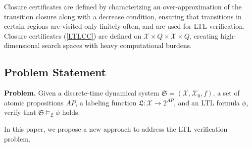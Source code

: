 Closure certificates are defined by characterizing an over-approximation of the transition closure along with a decrease condition, ensuring that transitions in certain regions are visited only finitely often, and are used for LTL verification. Closure certificates (\ref{LTLCC}) are defined on $\mathcal{X} \times Q \times \mathcal{X} \times Q$, creating high-dimensional search spaces with heavy computational burdens. 




\subsection{Problem Statement}
\textbf{Problem.} Given a discrete-time dynamical system $\mathfrak{S} = (\mathcal{X}, \mathcal{X}_0, f)$, a set of atomic propositions $AP$, a labeling function $\mathfrak{L}: \mathcal{X} \rightarrow 2^{AP}$, and an LTL formula $\phi$, verify that $\mathfrak{S} \models_{\mathfrak{L}} \phi$ holds.

\noindent
In this paper, we propose a new approach to address the LTL verification problem.
